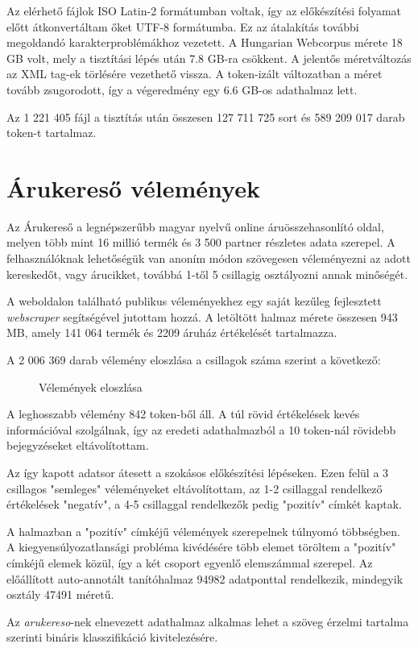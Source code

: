 Az elérhető fájlok ISO Latin-2 formátumban voltak, így az előkészítési folyamat előtt átkonvertáltam őket UTF-8 formátumba. Ez az átalakítás további megoldandó karakterproblémákhoz vezetett. A Hungarian Webcorpus mérete 18 GB volt, mely a tisztítási lépés után 7.8 GB-ra csökkent. A jelentős méretváltozás az XML tag-ek törlésére vezethető vissza. A token-izált változatban a méret tovább zsugorodott, így a végeredmény egy 6.6 GB-os adathalmaz lett.

Az 1 221 405 fájl a tisztítás után összesen 127 711 725 sort és 589 209 017 darab token-t tartalmaz.

\section{Árukereső vélemények}
Az Árukereső \cite{arukereso} a legnépszerűbb magyar nyelvű online áruösszehasonlító oldal, melyen több mint 16 millió termék és 3 500 partner részletes adata szerepel. A felhasználóknak lehetőségük van anoním módon szövegesen véleményezni az adott kereskedőt, vagy árucikket, továbbá 1-től 5 csillagig osztályozni annak minőségét.

A weboldalon található publikus véleményekhez egy saját kezűleg fejlesztett \textit{webscraper} segítségével jutottam hozzá. A letöltött halmaz mérete összesen 943 MB, amely 141 064 termék és 2209 áruház értékelését tartalmazza. 

A 2 006 369 darab vélemény eloszlása a csillagok száma szerint a következő:

\begin{figure}[H]
	\centering
	\hspace{5pt}
	\caption{Vélemények eloszlása}
	\label{fig:arukereso}
\end{figure}

A leghosszabb vélemény 842 token-ből áll. A túl rövid értékelések kevés információval szolgálnak, így az eredeti adathalmazból a 10 token-nál rövidebb bejegyzéseket eltávolítottam.

Az így kapott adatsor átesett a szokásos előkészítési lépéseken. Ezen felül a 3 csillagos "semleges" véleményeket eltávolítottam, az 1-2 csillaggal rendelkező értékelések "negatív", a 4-5 csillaggal rendelkezők pedig "pozitív" címkét kaptak.

A halmazban a "pozitív" címkéjű vélemények szerepelnek túlnyomó többségben. A kiegyensúlyozatlansági probléma kivédésére több elemet töröltem a "pozitív" címkéjű elemek közül, így a két csoport egyenlő elemszámmal szerepel. Az előállított auto-annotált tanítóhalmaz 94982 adatponttal rendelkezik, mindegyik osztály 47491 méretű. 

Az \textit{arukereso}-nek elnevezett adathalmaz alkalmas lehet a szöveg érzelmi tartalma szerinti bináris klasszifikáció kivitelezésére. 

